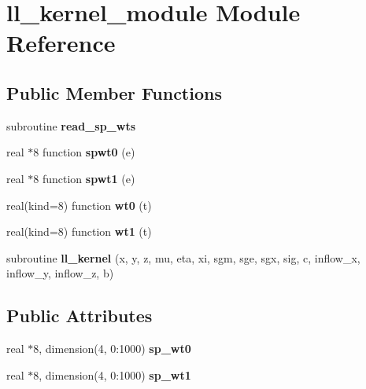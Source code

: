 \hypertarget{classll__kernel__module}{\section{ll\+\_\+kernel\+\_\+module Module Reference}
\label{classll__kernel__module}
}
\subsection*{Public Member Functions}
\begin{DoxyCompactItemize}
\item 
\hypertarget{classll__kernel__module_ae64b1d2d995c0e8c9d1014c83252100a}{subroutine {\bfseries read\+\_\+sp\+\_\+wts}}\label{classll__kernel__module_ae64b1d2d995c0e8c9d1014c83252100a}

\item 
\hypertarget{classll__kernel__module_abd3403d056c55f29237c37458c205516}{real $\ast$8 function {\bfseries spwt0} (e)}\label{classll__kernel__module_abd3403d056c55f29237c37458c205516}

\item 
\hypertarget{classll__kernel__module_a79e47a1da308cac21d2f614706b336a5}{real $\ast$8 function {\bfseries spwt1} (e)}\label{classll__kernel__module_a79e47a1da308cac21d2f614706b336a5}

\item 
\hypertarget{classll__kernel__module_a0f8329a7949f76c5316682e710a76f11}{real(kind=8) function {\bfseries wt0} (t)}\label{classll__kernel__module_a0f8329a7949f76c5316682e710a76f11}

\item 
\hypertarget{classll__kernel__module_a8e6ae1b763dd657b55e2eba5bd311e2f}{real(kind=8) function {\bfseries wt1} (t)}\label{classll__kernel__module_a8e6ae1b763dd657b55e2eba5bd311e2f}

\item 
\hypertarget{classll__kernel__module_a27d3794c74e14ccbb0297fd8ebdccdd3}{subroutine {\bfseries ll\+\_\+kernel} (x, y, z, mu, eta, xi, sgm, sge, sgx, sig, c, inflow\+\_\+x, inflow\+\_\+y, inflow\+\_\+z, b)}\label{classll__kernel__module_a27d3794c74e14ccbb0297fd8ebdccdd3}

\end{DoxyCompactItemize}
\subsection*{Public Attributes}
\begin{DoxyCompactItemize}
\item 
\hypertarget{classll__kernel__module_a4f8600d6061bd3d372282cac9efbab25}{real $\ast$8, dimension(4, 0\+:1000) {\bfseries sp\+\_\+wt0}}\label{classll__kernel__module_a4f8600d6061bd3d372282cac9efbab25}

\item 
\hypertarget{classll__kernel__module_ae9ebcee33ee11a014a911c8f1552c216}{real $\ast$8, dimension(4, 0\+:1000) {\bfseries sp\+\_\+wt1}}\label{classll__kernel__module_ae9ebcee33ee11a014a911c8f1552c216}

\end{DoxyCompactItemize}


